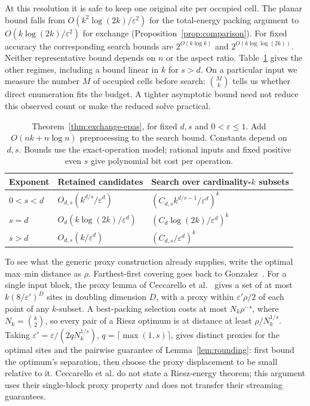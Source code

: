 \documentclass[a4paper,12pt]{article}
\numberwithin{equation}{section}
\begin{document}
At this resolution it is safe to keep one original site per occupied cell. The planar bound
falls from $O(k^2\log(2k)/\varepsilon^2)$ for the total-energy packing argument to
$O(k\log(2k)/\varepsilon^2)$ for exchange (Proposition~\ref{prop:comparison}).
For fixed accuracy the corresponding search bounds are $2^{O(k\log k)}$ and
$2^{O(k\log\log(2k))}$. Neither representative bound depends on $n$ or the aspect ratio.
Table~\ref{tab:regimes} gives the other regimes, including a bound linear in $k$ for $s>d$.
On a particular input we measure the number $M$ of occupied cells before search:
$\binom Mk$ tells us whether direct enumeration fits the budget. A tighter asymptotic bound
need not reduce this observed count or make the reduced solve practical.

\begin{table}[t]
\caption{Theorem~\ref{thm:exchange-epas}, for fixed $d,s$ and $0<\varepsilon\le1$. Add $O(nk+n\log n)$ preprocessing to the search bound. Constants depend on $d,s$. Bounds use the exact-operation model; rational inputs and fixed positive even $s$ give polynomial bit cost per operation.}\label{tab:regimes}
\centering\small
\begin{tabular}{lll}
\hline
Exponent & Retained candidates & Search over cardinality-$k$ subsets\\\hline
$0<s<d$ & $O_{d,s}(k^{d/s}/\varepsilon^d)$ & $(C_{d,s}k^{d/s-1}/\varepsilon^d)^k$\\
$s=d$ & $O_d(k\log(2k)/\varepsilon^d)$ & $(C_d\log(2k)/\varepsilon^d)^k$\\
$s>d$ & $O_{d,s}(k/\varepsilon^d)$ & $(C_{d,s}/\varepsilon^d)^k$\\\hline
\end{tabular}
\end{table}

To see what the generic proxy construction already supplies, write the optimal max--min distance as $\rho$.
Farthest-first covering goes back to Gonzalez~\cite[Section 2]{gonzalez1985}. For a single input block, the proxy lemma of Ceccarello
et al.~\cite[Section 5, Lemma 5]{ceccarello2017} gives a set of at most
$k(8/\varepsilon')^D$ sites in doubling dimension $D$, with a proxy within
$\varepsilon'\rho/2$ of each point of any $k$-subset. A best-packing selection costs at most
$N_k\rho^{-s}$, where $N_k=\binom{k}{2}$, so every pair of a Riesz optimum is at distance
at least $\rho/N_k^{1/s}$. Taking $\varepsilon'=\varepsilon/(2qN_k^{1/s})$, $q=\lceil\max(1,s)\rceil$, gives
distinct proxies for the optimal sites and the pairwise guarantee of Lemma~\ref{lem:rounding}:
first bound the optimum's separation, then choose the proxy displacement to be small relative to it.
Ceccarello et al. do not state a Riesz-energy theorem; this argument uses their single-block
proxy property and does not transfer their streaming guarantees.
\end{document}
